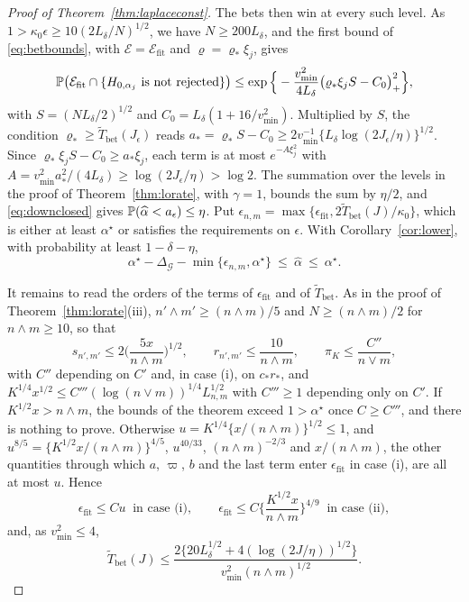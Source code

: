 \begin{proof}[Proof of Theorem~\ref{thm:laplaceconst}]
The bets then win at every such level. As $1>\kappa_0\epsilon\ge10(2L_\delta/N)^{1/2}$, we have $N\ge200L_\delta$, and
the first bound of \eqref{eq:betbounds}, with $\mathcal E=\mathcal E_{\mathrm{fit}}$ and $\varrho=\varrho_\ast\xi_j$,
gives
\[
\mathbb{P}\big(\mathcal E_{\mathrm{fit}}\cap\{H_{0,\alpha_j}\text{ is not rejected}\}\big)
\le\exp\Big\{-\frac{v^2_{\min}}{4L_\delta}\big(\varrho_\ast\xi_jS-C_0\big)_+^2\Big\},
\]
with $S=(NL_\delta/2)^{1/2}$ and $C_0=L_\delta(1+16/v^2_{\min})$. Multiplied by $S$, the condition
$\varrho_\ast\ge\widetilde T_{\mathrm{bet}}(J_\epsilon)$ reads
$a_\ast=\varrho_\ast S-C_0\ge2v_{\min}^{-1}\{L_\delta\log(2J_\epsilon/\eta)\}^{1/2}$. Since
$\varrho_\ast\xi_jS-C_0\ge a_\ast\xi_j$, each term is at most $e^{-A\xi_j^2}$ with
$A=v^2_{\min}a_\ast^2/(4L_\delta)\ge\log(2J_\epsilon/\eta)>\log2$. The summation over the levels in the proof of
Theorem~\ref{thm:lorate}, with $\gamma=1$, bounds the sum by $\eta/2$, and \eqref{eq:downclosed} gives
$\mathbb{P}(\widehat\alpha<a_\epsilon)\le\eta$. Put $\epsilon_{n,m}=\max\{\epsilon_{\mathrm{fit}},2\widetilde
T_{\mathrm{bet}}(J)/\kappa_0\}$, which is either at least $\alpha^\star$ or satisfies the requirements on $\epsilon$.
With Corollary~\ref{cor:lower}, with probability at least $1-\delta-\eta$,
\[
\alpha^\star-\Delta_{\mathcal G}-\min\{\epsilon_{n,m},\alpha^\star\}\ \le\ \widehat\alpha\ \le\ \alpha^\star .
\]

It remains to read the orders of the terms of $\epsilon_{\mathrm{fit}}$ and of $\widetilde T_{\mathrm{bet}}$. As in the
proof of Theorem~\ref{thm:lorate}(iii), $n'\wedge m'\ge(n\wedge m)/5$ and $N\ge(n\wedge m)/2$ for $n\wedge m\ge10$, so
that
\[
s_{n',m'}\le2\Big(\frac{5x}{n\wedge m}\Big)^{1/2},\qquad r_{n',m'}\le\frac{10}{n\wedge m},\qquad
\pi_K\le\frac{C''}{n\vee m},
\]
with $C''$ depending on $C'$ and, in case (i), on $c_\ast r_\ast$, and
$K^{1/4}x^{1/2}\le C'''(\log(n\vee m))^{1/4}L_{n,m}^{1/2}$ with $C'''\ge1$ depending only on $C'$. If
$K^{1/2}x>n\wedge m$, the bounds of the theorem exceed $1>\alpha^\star$ once $C\ge C'''$, and there is nothing to prove.
Otherwise $u=K^{1/4}\{x/(n\wedge m)\}^{1/2}\le1$, and $u^{8/5}=\{K^{1/2}x/(n\wedge m)\}^{4/5}$, $u^{40/33}$,
$(n\wedge m)^{-2/3}$ and $x/(n\wedge m)$, the other quantities through which $a$, $\varpi$, $b$ and the last term enter
$\epsilon_{\mathrm{fit}}$ in case (i), are all at most $u$. Hence
\[
\epsilon_{\mathrm{fit}}\le Cu\ \text{ in case (i)},\qquad
\epsilon_{\mathrm{fit}}\le C\Big\{\frac{K^{1/2}x}{n\wedge m}\Big\}^{4/9}\ \text{ in case (ii)},
\]
and, as $v^2_{\min}\le4$,
\[
\widetilde T_{\mathrm{bet}}(J)\le\frac{2\{20L_\delta^{1/2}+4(\log(2J/\eta))^{1/2}\}}{v^2_{\min}(n\wedge m)^{1/2}}.
\]
\end{proof}

